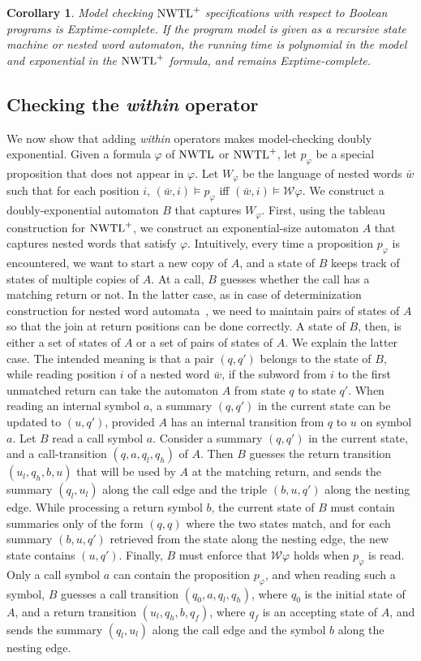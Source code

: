 \documentclass{LMCS}
\newcommand{\w}{{\bar{w}}}
\newcommand{\WW}{{\mathcal{W}}}
\theoremstyle{plain}
\newtheorem{corollary}[theorem]{Corollary}
\theoremstyle{definition}
\newcommand{\EXPTIME}{{\sc Exptime}}
\newcommand{\nwtlp}{\nwtl^+}
\begin{document}
\begin{corollary}
Model checking $\nwtlp$ specifications with respect to Boolean programs
is \EXPTIME-complete.  If the program model is given as a recursive
state machine or nested word automaton, the running time is
polynomial in the model and exponential in the $\nwtlp$ formula,
and remains \EXPTIME-complete.
\end{corollary}

\subsection{Checking the {\em within} operator}

We now show that adding {\em within} operators makes model-checking
doubly exponential. 
Given a formula $\varphi$ of $\text{\rm NWTL}$ or $\nwtlp$, let $p_\varphi$ be a special
proposition that does not appear in $\varphi$. Let $W_\varphi$ be the
language of nested words $\w$ such that for each position $i$,
$(\w,i)\models p_\varphi$ iff $(\w,i)\models \WW \varphi$.  We 
construct a doubly-exponential automaton $B$
that captures  $W_\varphi$.  
First, using the tableau construction for $\nwtlp$,
we construct an exponential-size automaton $A$ 
that captures nested words that satisfy $\varphi$.
Intuitively, every time a proposition $p_\varphi$ is encountered,
we want to start a new copy of $A$, and a state of $B$ keeps track of
states of multiple copies of $A$. 
At a call, $B$ guesses whether the call has a matching return or not.
In the latter case, 
as in case of determinization
construction for nested word automata~\cite{nested}, 
we need to 
maintain pairs of states of $A$ so that the join at return positions
can be done correctly.
A state of $B$, then, is either a set of states of $A$ or a set of pairs
of states of $A$. We explain the latter case.
The intended meaning is that a
pair $(q,q')$ belongs to the state of $B$, while reading position $i$
of a nested word $\w$, if the subword from $i$ to the first unmatched return
can take the automaton $A$ from state $q$ to state $q'$. 
When reading an internal symbol $a$, a summary $(q,q')$ in the current state
can be updated to $(u,q')$, provided $A$ has an internal transition from $q$ to
$u$ on symbol $a$. Let $B$ read a call symbol $a$.
Consider a summary $(q,q')$ in the current state, and a call-transition 
$(q,a,q_l,q_h)$ of $A$. Then $B$ guesses the return transition $(u_l,q_h,b,u)$ that will
be used by $A$ at the matching return, and sends the summary
$(q_l,u_l)$ along the call edge and the triple $(b,u,q')$ along the nesting edge.
While processing a return symbol $b$, the current state of $B$ must contain
summaries only of the form $(q,q)$ where the two states match, and
for each summary $(b,u,q')$ retrieved from the state along the nesting edge,
the new state contains $(u,q')$.
Finally, $B$ must enforce that $\WW\varphi$ holds when $p_\varphi$ is read.
Only a call symbol $a$ can contain 
the proposition 
$p_\varphi$, and when reading
such a symbol, $B$ guesses a call transition $(q_0,a,q_l,q_h)$, where $q_0$ is the initial
state of $A$, and a return transition $(u_l,q_h,b,q_f)$, 
where $q_f$ is an accepting state of $A$,
and sends the summary $(q_l,u_l)$ along the call edge and 
the symbol $b$ along the nesting edge.
\end{document}
